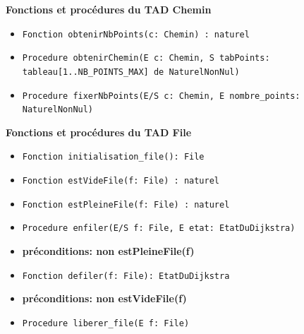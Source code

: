 \documentclass[11pt,a4paper]{article}
\begin{document}
\vspace{1.1em}

\textbf{Fonctions et procédures du TAD Chemin}
\begin{itemize}
    \item\texttt{Fonction obtenirNbPoints(c: Chemin) : naturel}
    \newline
    \item\texttt{Procedure obtenirChemin(E c: Chemin, S tabPoints: tableau[1..NB\_POINTS\_MAX] de NaturelNonNul)}
    \newline
    \item\texttt{Procedure fixerNbPoints(E/S c: Chemin, E nombre\_points: NaturelNonNul)}
\end{itemize}

\vspace{1.1em}

\textbf{Fonctions et procédures du TAD File}
\begin{itemize}
    \item\texttt{Fonction initialisation\_file(): File}
    \newline
    \item\texttt{Fonction estVideFile(f: File) : naturel}
    \newline
    \item\texttt{Fonction estPleineFile(f: File) : naturel}    
    \newline
    \item\texttt{Procedure enfiler(E/S f: File, E etat: EtatDuDijkstra)}
    \item \textbf{préconditions: non estPleineFile(f)}
    \newline
    \item\texttt{Fonction defiler(f: File): EtatDuDijkstra}
    \item \textbf{préconditions: non estVideFile(f)}
    \newline
    \item\texttt{Procedure liberer\_file(E f: File)}
\end{itemize}

\vspace{1.1em}
\end{document}
